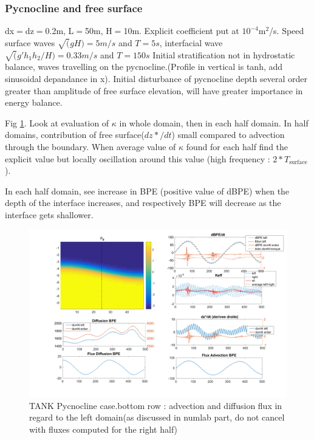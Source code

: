 \subsubsection{Pycnocline and free surface}

dx$=$dz$=$0.2m, L$=$50m, H$=$10m. Explicit coefficient put at $10^{-4}$m$^2$/s. Speed surface waves $\sqrt(gH)=5m/s$ and $T=5s$, interfacial wave $\sqrt(g'h_1h_2/H)=0.33m/s$ and $T=150s$
Initial stratification not in hydrostatic balance, waves travelling on the pycnocline.(Profile in vertical is tanh, add sinusoidal depandance in x). Initial disturbance of pycnocline depth several order greater than amplitude of free surface elevation, will have greater importance in energy balance.

Fig \ref{figCpsin}. Look at evaluation of $\kappa$ in whole domain, then in each half domain. In half domains, contribution of free surface($dz*/dt$) small compared to advection through the boundary.  When average value of $\kappa$ found for each half find the explicit value but locally oscillation around this value (high frequency : $2*T_{\text{surface}}$).

In each half domain, see increase in BPE (positive value of dBPE) when the depth of the interface increases, and respectively BPE will decrease as the interface gets shallower.

\begin{figure}[h!]
\centering
\includegraphics[width=1\textwidth]{./CHAP_BPE/AGBPE_numlab7.png}
\caption{TANK Pycnocline case.bottom row : advection and diffusion flux in regard to the left domain(as discussed in numlab part, do not cancel with fluxes computed for the right half)}
\label{figCpsin}
\end{figure}

